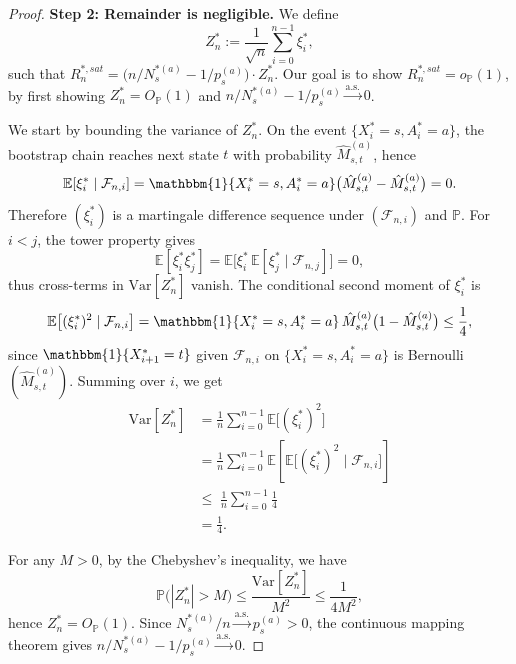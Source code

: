 \documentclass{article}
\numberwithin{equation}{section}
\newcommand{\indicator}{\mathbbm{1}}
\begin{document}
\begin{proof}
\medskip\noindent\textbf{Step 2: Remainder is negligible.}
We define
\[
Z_n^\ast := \frac{1}{\sqrt{n}}\sum_{i=0}^{n-1}\xi_i^\ast,
\]
such that $R_n^{\ast,sat}=\bigl(n/N_s^{\ast(a)}-1/p_s^{(a)}\bigr)\cdot Z_n^\ast$.
Our goal is to show $R_n^{\ast,sat}=o_{\mathbb{P}}(1)$, by first showing $Z_n^\ast=O_{\mathbb{P}}(1)$ and $n/N_s^{\ast(a)}-1/p_s^{(a)}\xrightarrow{\mathrm{a.s.}}0$.

We start by bounding the variance of $Z_n^\ast$.
On the event $\{X_i^\ast=s,A_i^\ast=a\}$, the bootstrap chain reaches next state $t$ with probability $\hat M_{s,t}^{(a)}$, hence
\[
\mathbb{E}[\xi_i^\ast\mid\mathcal{F}_{n,i}]
= \indicator\{X_i^\ast=s,A_i^\ast=a\}\bigl(\hat M_{s,t}^{(a)}-\hat M_{s,t}^{(a)}\bigr)=0.
\]
Therefore $(\xi_i^\ast)$ is a martingale difference sequence under $(\mathcal{F}_{n,i})$ and $\mathbb{P}$. For $i<j$, the tower property gives
\[
\mathbb{E}[\xi_i^\ast\xi_j^\ast]
= \mathbb{E}\bigl[\xi_i^\ast\,\mathbb{E}[\xi_j^\ast\mid\mathcal{F}_{n,j}]\bigr]=0,
\]
thus cross-terms in $\mathrm{Var}[Z_n^\ast]$ vanish. 
The conditional second moment of $\xi_i^\ast$ is
\[
\mathbb{E}\bigl[(\xi_i^\ast)^2\mid\mathcal{F}_{n,i}\bigr]
= \indicator\{X_i^\ast=s,A_i^\ast=a\}\,\hat M_{s,t}^{(a)}\bigl(1-\hat M_{s,t}^{(a)}\bigr) \le \frac{1}{4},
\]
since $\indicator\{X_{i+1}^\ast=t\}$ given $\mathcal{F}_{n,i}$ on $\{X_i^\ast=s,A_i^\ast=a\}$ is Bernoulli$(\hat M_{s,t}^{(a)})$.
Summing over $i$, we get
\begin{align*}
\mathrm{Var}[Z_n^\ast]
&= \frac{1}{n}\sum_{i=0}^{n-1}\mathbb{E}\bigl[(\xi_i^\ast)^2\bigr] \\
&= \frac{1}{n}\sum_{i=0}^{n-1}\mathbb{E}\left[\mathbb{E}\bigl[(\xi_i^\ast)^2 \mid \mathcal{F}_{n,i} \bigr] \right] \\
&\le \; \frac{1}{n} \sum_{i=0}^{n-1} \frac{1}{4} \\
&=\frac{1}{4}.
\end{align*}

For any $M>0$, by the Chebyshev's inequality, we have
\[
\mathbb{P}\bigl(|Z_n^\ast|>M\bigr)
\le \frac{\mathrm{Var}[Z_n^\ast]}{M^2}
\le \frac{1}{4M^2},
\]
hence $Z_n^\ast=O_{\mathbb{P}}(1)$. Since $N_s^{\ast(a)}/n\xrightarrow{\mathrm{a.s.}}p_s^{(a)}>0$, the continuous mapping theorem gives $n/N_s^{\ast(a)}-1/p_s^{(a)}\xrightarrow{\mathrm{a.s.}}0$.


\end{proof}
\end{document}
